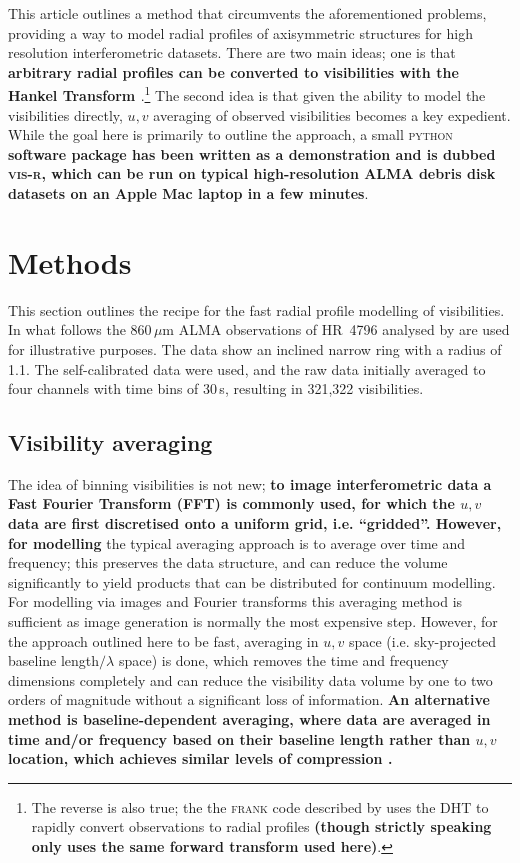\documentclass[fleqn,usenatbib]{mnras}
\begin{document}
This article outlines a method that circumvents the aforementioned problems, providing a way to model radial profiles of axisymmetric structures for high resolution interferometric datasets. There are two main ideas; one is that \textbf{arbitrary radial profiles can be converted to visibilities with the Hankel Transform \citep[in this case the Discrete transform, or DHT,][]{1987CoPhC..43..181J,1994JChPh.101.3936L,2015JOSAA..32..611B}}.\footnote{The reverse is also true; the the \textsc{frank} code described by \citet{2020MNRAS.tmp.1491J} uses the DHT to rapidly convert observations to radial profiles \textbf{(though strictly speaking only uses the same forward transform used here)}.} The second idea is that given the ability to model the visibilities directly, $u,v$ averaging of observed visibilities becomes a key expedient. While the goal here is primarily to outline the approach, a small \textsc{python} \textbf{software package has been written as a demonstration and is dubbed \textsc{vis-r}, which can be run on typical high-resolution ALMA debris disk datasets on an Apple Mac laptop in a few minutes}.

\section{Methods}

This section outlines the recipe for the fast radial profile modelling of visibilities. In what follows the 860\,$\mu$m ALMA observations of HR~4796 analysed by \citet{2018MNRAS.475.4924K} are used for illustrative purposes. The data show an inclined narrow ring with a radius of 1.1\arcsec. The self-calibrated data were used, and the raw data initially averaged to four channels with time bins of 30\,s, resulting in 321,322 visibilities.

\subsection{Visibility averaging}\label{sec:avg}

The idea of binning visibilities is not new; \textbf{to image interferometric data a Fast Fourier Transform (FFT) is commonly used, for which the $u,v$ data are first discretised onto a uniform grid, i.e. ``gridded''. However, for modelling} the typical averaging approach is to average over time and frequency; this preserves the data structure, and can reduce the volume significantly to yield products that can be distributed for continuum modelling. For modelling via images and Fourier transforms this averaging method is sufficient as image generation is normally the most expensive step. However, for the approach outlined here to be fast, averaging in $u,v$ space (i.e. sky-projected baseline length$/\lambda$ space) is done, which removes the time and frequency dimensions completely and can reduce the visibility data volume by one to two orders of magnitude without a significant loss of information. \textbf{An alternative method is baseline-dependent averaging, where data are averaged in time and/or frequency based on their baseline length rather than $u,v$ location, which achieves similar levels of compression \citep{2018MNRAS.476.2029W}.}
\end{document}
